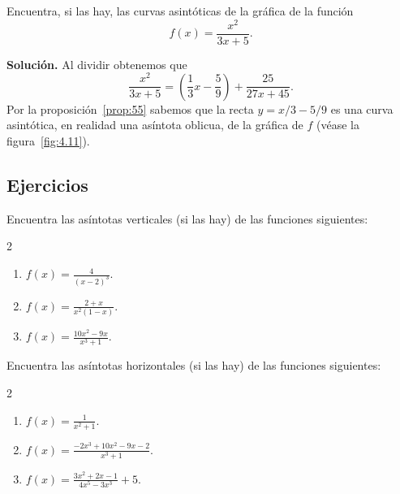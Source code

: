 \documentclass[12pt,a4paper]{book}
\begin{document}
    \begin{ejemplo}\label{ejm:68}
        Encuentra, si las hay, las curvas asintóticas
        de la gráfica de la función
        \begin{equation*}
            f(x)=\frac{x^{2}}{3x+5}.
        \end{equation*}

        \textbf{Solución.} Al dividir obtenemos que
        \begin{equation*}
            \frac{x^{2}}{3x+5}=\left(\frac{1}{3}x-\frac{5}{9}\right)+\frac{25}{27x+45}.
        \end{equation*}
        Por la proposición~\ref{prop:55} sabemos que la recta $y=x/3-5/9$ es una curva
        asintótica, en realidad una asíntota oblicua, de la gráfica de $f$ (véase la figura~\ref{fig:4.11}).
    \end{ejemplo}

    \par{}\subsection*{Ejercicios}

    \begin{ejercicio}\label{ej:187}
        Encuentra las asíntotas verticales (si las hay) de las funciones
        siguientes:
        \begin{multicols}{2}
        \begin{enumerate}[nosep]
            \item $f(x)=\frac{4}{(x-2)^{3}}$.
            \item $f(x)=\frac{2+x}{x^{2}(1-x)}$.
            \item $f(x)=\frac{10x^{2}-9x}{x^{3}+1}$.
        \end{enumerate}
        \end{multicols}
    \end{ejercicio}

    \begin{ejercicio}\label{ej:188}
        Encuentra las asíntotas horizontales (si las hay) de las funciones
        siguientes:
        \begin{multicols}{2}
        \begin{enumerate}[nosep]
            \item $f(x)=\frac{1}{x^{2}+1}$.
            \item $f(x)=\frac{-2x^{3}+10x^{2}-9x-2}{x^{3}+1}$.
            \item $f(x)=\frac{3x^{2}+2x-1}{4x^{5}-3x^{3}}+5$.
        \end{enumerate}
        \end{multicols}
    \end{ejercicio}
\end{document}
